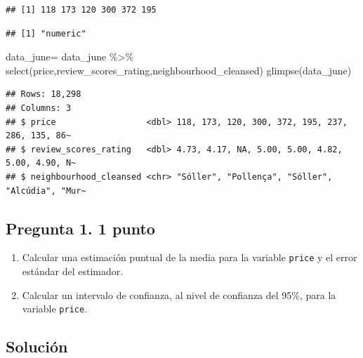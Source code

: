 \documentclass[
]{article}
\newenvironment{Shaded}{\begin{snugshade}}{\end{snugshade}}
\newcommand{\FunctionTok}[1]{\textcolor[rgb]{0.00,0.00,0.00}{#1}}
\newcommand{\NormalTok}[1]{#1}
\newcommand{\OtherTok}[1]{\textcolor[rgb]{0.56,0.35,0.01}{#1}}
\newcommand{\SpecialCharTok}[1]{\textcolor[rgb]{0.00,0.00,0.00}{#1}}
\begin{document}
\begin{verbatim}
## [1] 118 173 120 300 372 195
\end{verbatim}

\begin{Shaded}
\end{Shaded}

\begin{verbatim}
## [1] "numeric"
\end{verbatim}

\begin{Shaded}
\begin{Highlighting}[]
\NormalTok{data\_june}\OtherTok{=}\NormalTok{ data\_june }\SpecialCharTok{\%\textgreater{}\%} \FunctionTok{select}\NormalTok{(price,review\_scores\_rating,neighbourhood\_cleansed)}
\FunctionTok{glimpse}\NormalTok{(data\_june)}
\end{Highlighting}
\end{Shaded}

\begin{verbatim}
## Rows: 18,298
## Columns: 3
## $ price                  <dbl> 118, 173, 120, 300, 372, 195, 237, 286, 135, 86~
## $ review_scores_rating   <dbl> 4.73, 4.17, NA, 5.00, 5.00, 4.82, 5.00, 4.90, N~
## $ neighbourhood_cleansed <chr> "Sóller", "Pollença", "Sóller", "Alcúdia", "Mur~
\end{verbatim}

\hypertarget{pregunta-1.-1-punto}{%
\subsection{\texorpdfstring{Pregunta 1. \textbf{1
punto}}{Pregunta 1. 1 punto}}\label{pregunta-1.-1-punto}}

\begin{enumerate}
\def\labelenumi{\alph{enumi}.}
\item
  Calcular una estimación puntual de la media para la variable
  \texttt{price} y el error estándar del estimador.
\item
  Calcular un intervalo de confianza, al nivel de confianza del 95\%,
  para la variable \texttt{price}.
\end{enumerate}

\hypertarget{soluciuxf3n}{%
\subsection{Solución}\label{soluciuxf3n}}
\end{document}
